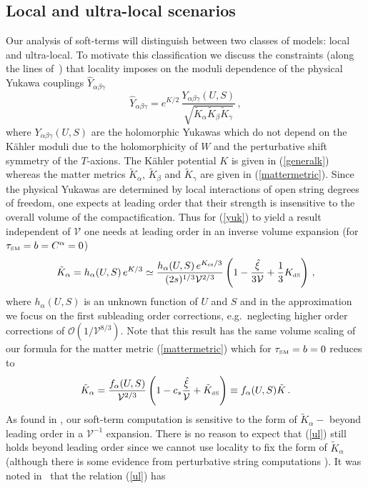 \documentclass[11pt,a4paper]{article}
\newcommand{\be}{\begin{equation}}
\newcommand{\ee}{\end{equation}}
\def\SM{{\scriptscriptstyle \rm SM}}
\def\dS{{\scriptscriptstyle \rm dS}}
\newcommand\vo{{\mathcal{V}}}
\newcommand{\mc}{\mathcal}
\begin{document}
\subsection{Local and ultra-local scenarios}
\label{soft}

Our analysis of soft-terms will distinguish between two classes of models: local and ultra-local.
To motivate this classification we discuss the constraints (along the lines of~\cite{Conlon:2006tj}) that locality imposes on the moduli dependence
of the physical Yukawa couplings $\hat{Y}_{\alpha \beta \gamma}$
\be
\label{yuk}
\hat{Y}_{\alpha \beta \gamma} =e^{K/2}\,\frac{Y_{\alpha \beta \gamma}(U,S)}{\sqrt {\tilde{K}_\alpha \tilde{K}_\beta \tilde{K}_\gamma} }\, ,
\ee
where $Y_{\alpha \beta \gamma}(U,S)$ are the holomorphic Yukawas which do not depend on the K\"ahler moduli
due to the holomorphicity of $W$ and the perturbative shift symmetry of the $T$-axions. The K\"ahler potential $K$ is given in (\ref{generalk})
whereas the matter metrics $\tilde{K}_\alpha$, $\tilde{K}_\beta$ and $\tilde{K}_\gamma$ are given in (\ref{mattermetric}).
Since the physical Yukawas are determined by local interactions of open string
degrees of freedom, one expects at leading order that their strength is insensitive
to the overall volume of the compactification. Thus for (\ref{yuk}) to yield a result independent of $\vo$
one needs at leading order in an inverse volume expansion (for $\tau_\SM = b= C^\alpha= 0$)
\be
\label{ul}
\tilde{K}_\alpha = h_\alpha(U,S)\,e^{K/3} \simeq  \frac{h_\alpha(U,S)\,e^{K_{\rm cs}/3}}{(2s)^{1/3}\vo^{2/3}}
\left(1- \frac{\hat\xi}{3\vo}  + \frac 13 K_\dS\right)\,,
\ee
where $h_\alpha(U,S)$ is an unknown function of $U$ and $S$ and in the approximation we focus on the first subleading order corrections, e.g.~neglecting higher order corrections of $\mc{O}\left(1/\vo^{8/3}\right)$. Note
that this result has the same volume scaling of our formula for the matter metric (\ref{mattermetric}) which for $\tau_\SM = b= 0$ reduces to
\be
\tilde{K}_{\alpha} = \frac{f_\alpha(U,S)}{\vo^{2/3}} \left(1 - c_s \frac{\hat\xi}{\vo}
+ \tilde{K}_\dS\right)\equiv f_\alpha(U,S)\tilde{K}\,.
\label{newKtilde}
\ee
As found in \cite{Blumenhagen:2009gk}, our soft-term computation is sensitive to the form of $\tilde{K}_\alpha-$
beyond leading order in a $\vo^{-1}$ expansion. There is no reason
to expect that (\ref{ul}) still holds beyond leading order
since we cannot use locality to fix the form of $\tilde{K}_\alpha$
(although there is some evidence from perturbative string computations \cite{Conlon:2011jq}).
It was noted in~\cite{Blumenhagen:2009gk} that the relation (\ref{ul}) has
\end{document}
